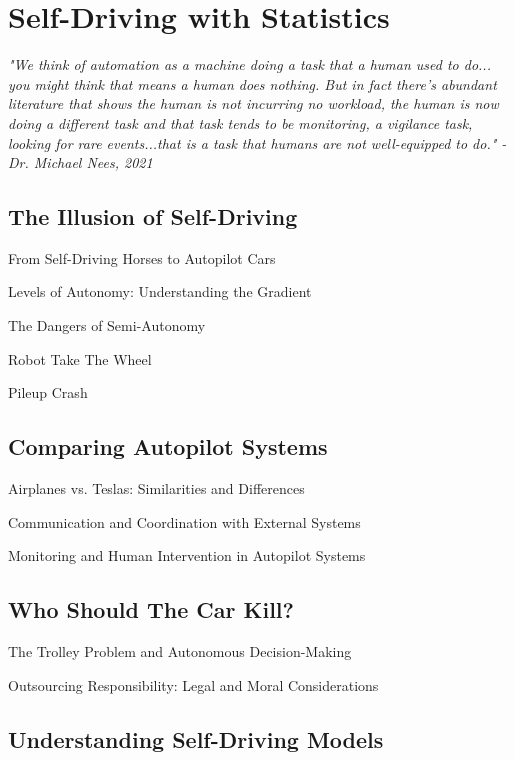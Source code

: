 \setchapterpreamble[u]{\margintoc}
\chapter{Self-Driving with Statistics}

\textit{"We think of automation as a machine doing a task that a human used to do... you might think that means a human does nothing. But in fact there's abundant literature that shows the human is not incurring no workload, the human is now doing a different task and that task tends to be monitoring, a vigilance task, looking for rare events...that is a task that humans are not well-equipped to do." - Dr. Michael Nees, 2021} \cite{nees2021}


\section{The Illusion of Self-Driving}

From Self-Driving Horses to Autopilot Cars

Levels of Autonomy: Understanding the Gradient

The Dangers of Semi-Autonomy

Robot Take The Wheel \cite{torchinskyboeckmann2019}

Pileup Crash \cite{pileupcrash}

\section{Comparing Autopilot Systems}

Airplanes vs. Teslas: Similarities and Differences

Communication and Coordination with External Systems

Monitoring and Human Intervention in Autopilot Systems

\section{Who Should The Car Kill?}

The Trolley Problem and Autonomous Decision-Making

Outsourcing Responsibility: Legal and Moral Considerations

\section{Understanding Self-Driving Models}

